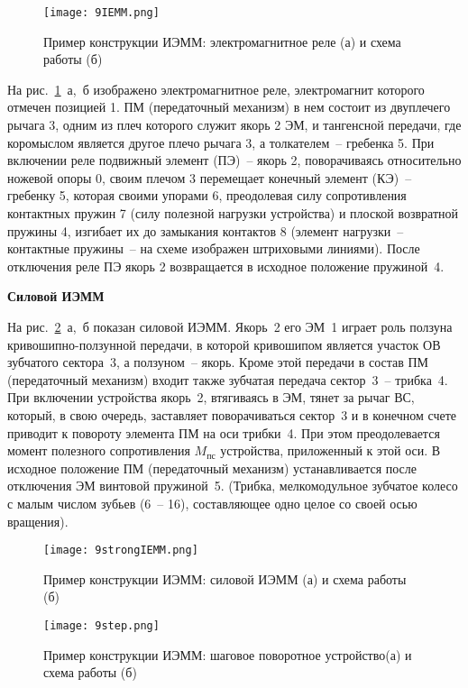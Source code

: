 \begin{figure}[h!]
	\caption{ Пример конструкции ИЭММ: электромагнитное реле (а) и схема работы (б) }
	\texttt{[image: 9IEMM.png]}
	\label{pic:9IEMM}
\end{figure}

На рис.~\ref{pic:9IEMM}~а,~б изображено электромагнитное реле, электромагнит которого отмечен позицией 1. ПМ (передаточный механизм)  в нем состоит из двуплечего рычага 3, одним из плеч которого служит якорь 2 ЭМ, и тангенсной передачи, где коромыслом является другое плечо рычага 3, а толкателем~-- гребенка 5. При включении реле подвижный элемент (ПЭ)~-- якорь 2, поворачиваясь относительно ножевой опоры 0, своим плечом 3 перемещает конечный элемент (КЭ)~-- гребенку 5, которая своими упорами 6, преодолевая силу сопротивления контактных пружин 7 (силу полезной нагрузки устройства) и плоской возвратной пружины 4, изгибает их до замыкания контактов 8 (элемент нагрузки~-- контактные пружины~-- на схеме изображен штриховыми линиями). После отключения реле ПЭ якорь 2 возвращается в исходное положение пружиной~4.

\begin{flushleft}
\textbf{ Силовой ИЭММ }
\end{flushleft}

На рис.~\ref{pic:9strongIEMM}~а,~б показан силовой ИЭММ. Якорь~2 его ЭМ~1 играет роль ползуна кривошипно-ползунной передачи, в которой кривошипом является участок ОВ зубчатого сектора~3, а ползуном~-- якорь. Кроме этой передачи в состав ПМ (передаточный механизм) входит также зубчатая передача сектор~3~-- трибка~4. При включении устройства якорь~2, втягиваясь в ЭМ, тянет за рычаг ВС, который, в свою очередь, заставляет поворачиваться сектор~3 и в конечном счете приводит к повороту элемента ПМ на оси трибки~4. При этом преодолевается момент полезного сопротивления $ M_\text{пс} $ устройства, приложенный к этой оси. В исходное положение ПМ (передаточный механизм) устанавливается после отключения ЭМ винтовой пружиной~5. (Трибка, мелкомодульное зубчатое колесо с малым числом зубьев (6~-- 16), составляющее одно целое со своей осью вращения).

\begin{figure}[h!]
	\caption{ Пример конструкции ИЭММ: силовой ИЭММ (а) и схема работы (б) }
	\texttt{[image: 9strongIEMM.png]}
	\label{pic:9strongIEMM}
\end{figure}

\begin{figure}[h!]
	\caption{ Пример конструкции ИЭММ: шаговое поворотное устройство(а) и схема работы (б) }
	\texttt{[image: 9step.png]}
	\label{pic:9step}
\end{figure}

